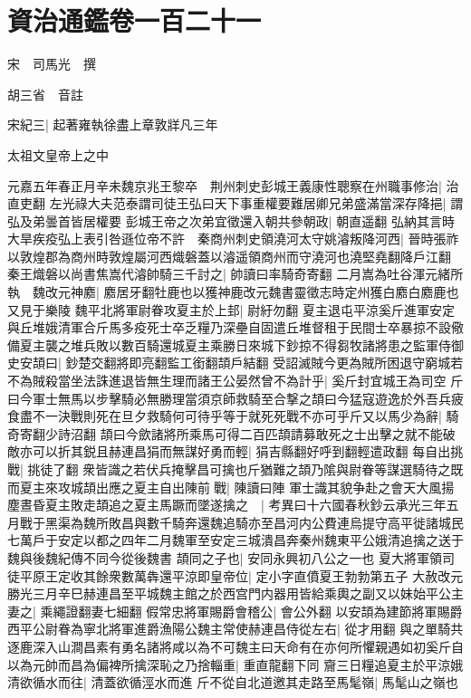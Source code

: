 \chapter{資治通鑑卷一百二十一}
宋　司馬光　撰

胡三省　音註

宋紀三|{
	起著雍執徐盡上章敦牂凡三年}


太祖文皇帝上之中

元嘉五年春正月辛未魏京兆王黎卒　荆州刺史彭城王義康性聰察在州職事修治|{
	治直吏翻}
左光祿大夫范泰謂司徒王弘曰天下事重權要難居卿兄弟盛滿當深存降挹|{
	謂弘及弟曇首皆居權要}
彭城王帝之次弟宜徵還入朝共參朝政|{
	朝直遥翻}
弘納其言時大旱疾疫弘上表引咎遜位帝不許　秦商州刺史領澆河太守姚濬叛降河西|{
	晉時張祚以敦煌郡為商州時敦煌屬河西熾磐蓋以濬遥領商州而守澆河也澆堅堯翻降戶江翻}
秦王熾磐以尚書焦嵩代濬帥騎三千討之|{
	帥讀曰率騎奇寄翻}
二月嵩為吐谷渾元緒所執　魏改元神䴥|{
	䴥居牙翻牡鹿也以獲神鹿改元魏書靈徵志時定州獲白䴥白䴥鹿也又見于樂陵}
魏平北將軍尉眷攻夏主於上邽|{
	尉紆勿翻}
夏主退屯平涼奚斤進軍安定與丘堆娥清軍合斤馬多疫死士卒乏糧乃深壘自固遣丘堆督租于民間士卒暴掠不設儆備夏主襲之堆兵敗以數百騎還城夏主乘勝日來城下鈔掠不得芻牧諸將患之監軍侍御史安頡曰|{
	鈔楚交翻將即亮翻監工銜翻頡戶結翻}
受詔滅賊今更為賊所困退守窮城若不為賊殺當坐法誅進退皆無生理而諸王公晏然曾不為計乎|{
	奚斤封宜城王為司空}
斤曰今軍士無馬以步擊騎必無勝理當須京師救騎至合撃之頡曰今猛寇遊逸於外吾兵疲食盡不一決戰則死在旦夕救騎何可待乎等于就死死戰不亦可乎斤又以馬少為辭|{
	騎奇寄翻少詩沼翻}
頡曰今歛諸將所乘馬可得二百匹頡請募敢死之士出擊之就不能破敵亦可以折其鋭且赫連昌狷而無謀好勇而輕|{
	狷吉縣翻好呼到翻輕遣政翻}
每自出挑戰|{
	挑徒了翻}
衆皆識之若伏兵掩擊昌可擒也斤猶難之頡乃隂與尉眷等謀選騎待之既而夏主來攻城頡出應之夏主自出陳前戰|{
	陳讀曰陣}
軍士識其貌争赴之會天大風揚塵晝昏夏主敗走頡追之夏主馬蹶而墜遂擒之　|{
	考異曰十六國春秋鈔云承光三年五月戰于黑渠為魏所敗昌與數千騎奔還魏追騎亦至昌河内公費連烏提守高平徙諸城民七萬戶于安定以都之四年二月魏軍至安定三城潰昌奔秦州魏東平公娥清追擒之送于魏與後魏紀傳不同今從後魏書}
頡同之子也|{
	安同永興初八公之一也}
夏大將軍領司徒平原王定收其餘衆數萬犇還平涼即皇帝位|{
	定小字直僨夏王勃勃第五子}
大赦改元勝光三月辛巳赫連昌至平城魏主館之於西宫門内器用皆給乘輿之副又以妹始平公主妻之|{
	乘繩證翻妻七細翻}
假常忠將軍賜爵會稽公|{
	會公外翻}
以安頡為建節將軍賜爵西平公尉眷為寧北將軍進爵漁陽公魏主常使赫連昌侍從左右|{
	從才用翻}
與之單騎共逐鹿深入山澗昌素有勇名諸將咸以為不可魏主曰天命有在亦何所懼親遇如初奚斤自以為元帥而昌為偏裨所擒深恥之乃捨輜重|{
	重直龍翻下同}
齎三日糧追夏主於平涼娥清欲循水而往|{
	清蓋欲循涇水而進}
斤不從自北道邀其走路至馬髦嶺|{
	馬髦山之嶺也}
